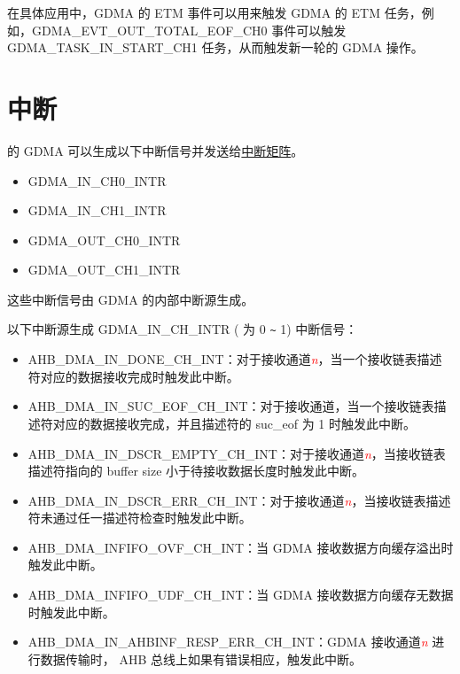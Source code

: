 \documentclass[main\_\_CN.tex]{subfiles}
\begin{document}
在具体应用中，GDMA 的 ETM 事件可以用来触发 GDMA 的 ETM 任务，例如，GDMA\_EVT\_OUT\_TOTAL\_EOF\_CH0 事件可以触发 GDMA\_TASK\_IN\_START\_CH1 任务，从而触发新一轮的 GDMA 操作。


\section{中断}

\chipname{} 的 GDMA 可以生成以下中断信号并发送给\hyperref[mod:intmtrx]{中断矩阵}。

    \begin{itemize}
        \item GDMA\_IN\_CH0\_INTR
        \item GDMA\_IN\_CH1\_INTR
        \item GDMA\_OUT\_CH0\_INTR
        \item GDMA\_OUT\_CH1\_INTR
    \end{itemize}

这些中断信号由 GDMA 的内部中断源生成。

以下中断源生成 GDMA\_IN\_CH\_INTR ( 为 0 \verb+~+ 1) 中断信号：

\begin{itemize}
    \item \label{int:GDMAINDONEINT}AHB\_DMA\_IN\_DONE\_CH\_INT：对于接收通道\textcolor{red}{\it{n}}，当一个接收链表描述符对应的数据接收完成时触发此中断。
    \item \label{int:GDMAINSUCEOFINT}AHB\_DMA\_IN\_SUC\_EOF\_CH\_INT：对于接收通道，当一个接收链表描述符对应的数据接收完成，并且描述符的 suc\_eof 为 1 时触发此中断。
    \item \label{int:GDMAINDSCREMPTYINT}AHB\_DMA\_IN\_DSCR\_EMPTY\_CH\_INT：对于接收通道\textcolor{red}{\it{n}}，当接收链表描述符指向的 buffer size 小于待接收数据长度时触发此中断。
    \item \label{int:GDMAINDSCRERRINT}AHB\_DMA\_IN\_DSCR\_ERR\_CH\_INT：对于接收通道\textcolor{red}{\it{n}}，当接收链表描述符未通过任一描述符检查时触发此中断。
    \item \label{int:GDMAINFIFOOVFINT} AHB\_DMA\_INFIFO\_OVF\_CH\_INT：当 GDMA 接收数据方向缓存溢出时触发此中断。
    \item \label{int:GDMAINFIFOUDFINT}AHB\_DMA\_INFIFO\_UDF\_CH\_INT：当 GDMA 接收数据方向缓存无数据时触发此中断。
    \item \label{int:GDMAINAHBINFRESPERRINT}AHB\_DMA\_IN\_AHBINF\_RESP\_ERR\_CH\_INT：GDMA 接收通道\textcolor{red}{\it{n}} 进行数据传输时， AHB 总线上如果有错误相应，触发此中断。
\end{itemize}
\end{document}

